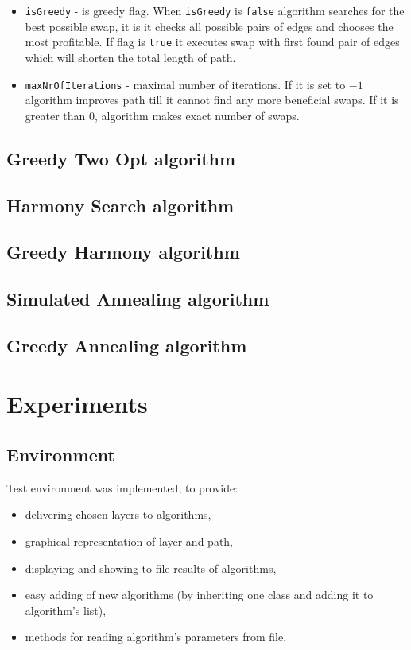 \documentclass[titlepage]{article}
\begin{document}
\begin{itemize}
	\item \texttt{isGreedy} - is greedy flag. When \texttt{isGreedy} is \texttt{false} algorithm searches for the best possible swap, it is it checks all possible pairs of edges and chooses the most profitable. If flag is \texttt{true} it executes swap with first found pair of edges which will shorten the total length of path.
	
	\item \texttt{maxNrOfIterations} - maximal number of iterations. If it is set to $-1$ algorithm improves path till it cannot find any more beneficial swaps. If it is greater than $0$, algorithm makes exact number of swaps.
	
\end{itemize}


\subsection{Greedy Two Opt algorithm}

\subsection{Harmony Search algorithm}

\subsection{Greedy Harmony algorithm}

\subsection{Simulated Annealing algorithm}

\subsection{Greedy Annealing algorithm}

\section{Experiments}
\subsection{Environment}
Test environment was implemented, to provide:
\begin{itemize}
\item delivering chosen layers to algorithms,
\item graphical representation of layer and path,
\item displaying and showing to file results of algorithms,
\item easy adding of new algorithms (by inheriting one class and adding it to algorithm's list),
\item methods for reading algorithm's parameters from file.
\end{itemize}
\end{document}
